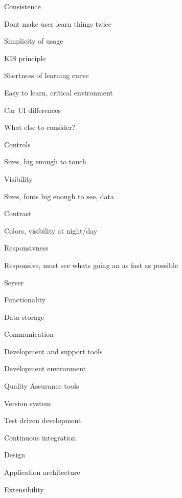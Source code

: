\seccc Consistence

Dont make user learn things twice

\seccc Simplicity of usage

KIS principle

\seccc Shortness of learning curve

Easy to learn, critical environment

\secc Car UI differences

What else to consider?

\seccc Controls

Sizes, big enough to touch 

\seccc Visibility

Sizes, fonts big enough to see, data

\seccc Contrast

Colors, visibility at night/day

\seccc Responsivness

Responsive, must see whats going an as fast as possible


\sec Server


\secc Functionality


\secc Data storage


\secc Communication


\sec Development and support tools


\secc Development environment


\secc Quality Assurance tools


\secc Version system


\secc Test driven development


\secc Continuous integration



\chap Design


\sec Application architecture


\secc Extensibility


